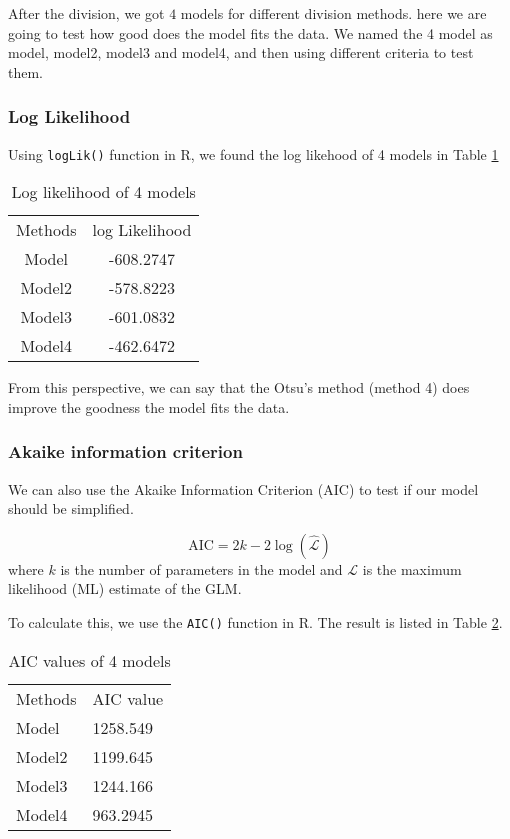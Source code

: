 \documentclass[11pt]{article}
\begin{document}
After the division, we got $4$ models for different division methods. here we are going to test how good does the model fits the data. We named the 4 model as model, model2, model3 and model4, and then using different criteria to test them.

\subsubsection{Log Likelihood}
Using \verb|logLik()| function in R, we found the log likehood of 4 models in Table {\ref{Table1}}
\begin{table}[!htbp]
\centering

\begin{tabular}{cc}
\rowcolor[HTML]{9B9B9B} 
{\color[HTML]{FFFFFF} Methods} & {\color[HTML]{FFFFFF} log Likelihood} \\
Model & -608.2747\\
\rowcolor[HTML]{EFEFEF} Model2 & -578.8223\\
Model3&  -601.0832\\
\rowcolor[HTML]{EFEFEF}Model4 & -462.6472  
\end{tabular}
\caption{Log likelihood of 4 models} 
\label{Table1}                
\end{table}

From this perspective, we can say that the Otsu's method (method 4) does improve the goodness the model fits the data.

\subsubsection{Akaike information criterion}

We can also use the Akaike Information Criterion (AIC) to test if our model should be simplified.

\begin{equation}
	\text{AIC}=2k-2\log(\hat{\mathcal{L}})
\end{equation}
where $k$ is the number of parameters in the model and $\mathcal{L} $ is the maximum likelihood (ML) estimate of the GLM.

To calculate this, we use the \verb|AIC()| function in R. The result is listed in Table {\ref{Table2}}.

\begin{table}[!htbp]
\centering
\begin{tabular}{ll}
\rowcolor[HTML]{9B9B9B} 
{\color[HTML]{FFFFFF} Methods} & {\color[HTML]{FFFFFF} AIC value} \\
Model & 1258.549\\
\rowcolor[HTML]{EFEFEF} 
Model2 & 1199.645\\
Model3& 1244.166\\
\rowcolor[HTML]{EFEFEF}
Model4 & 963.2945
\end{tabular}
\caption{AIC values of 4 models}
\label{Table2}                
\end{table}
\end{document}
